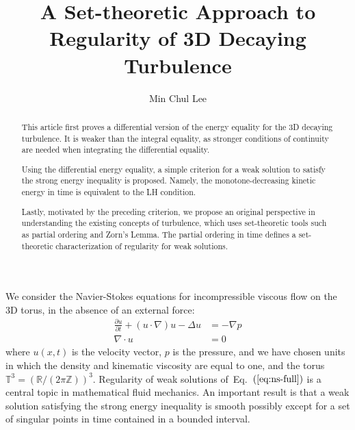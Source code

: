 \documentclass{article}
\def\eq#1{Eq.~$(\ref{#1})$}
\def\R{{\mathbb{R}}}
\def\T{{\mathbb{T}}}
\def\Z{{\mathbb{Z}}}
\begin{document}
\title{A Set-theoretic Approach to Regularity of 3D Decaying Turbulence} %



\author{Min Chul Lee}


\maketitle


\begin{abstract}
This article first proves a differential version of the energy equality for the 3D decaying turbulence. It is weaker than the integral equality, as stronger conditions of continuity are needed when integrating the differential equality.


Using the differential energy equality, a simple criterion for a weak solution to satisfy the strong energy inequality is proposed. Namely, the monotone-decreasing kinetic energy in time is equivalent to the LH condition. 

Lastly, motivated by the preceding criterion, we propose an original perspective in understanding the existing concepts of turbulence, which uses set-theoretic tools such as partial ordering and Zorn's Lemma. The partial ordering in time defines a set-theoretic characterization of regularity for weak solutions.
\end{abstract}

\vspace{10px}

\begin{center}
\end{center}



\begin{center}
    
\end{center}

\vspace{10px}

We consider the Navier-Stokes equations for incompressible viscous
flow on the 3D torus, in the absence of an
external force:
\begin{align}
\label{eq:ns-full}
 \frac{\partial u}{\partial t}+ (u \cdot \nabla)u  - \Delta u &=-\nabla p  \\
 \nabla \cdot u&=0
\end{align}
where $u(x,t)$ is the velocity vector, $p$ is the pressure, and we
have chosen units in which the density and kinematic viscosity are
equal to one, and the torus $\T^3 = (\R/(2\pi\Z))^3$. Regularity of weak solutions of~\eq{eq:ns-full} is a central topic in mathematical fluid mechanics. An important result is that a weak solution satisfying the strong energy inequality is smooth possibly except for a set of singular points in time contained in a bounded interval.
\end{document}
